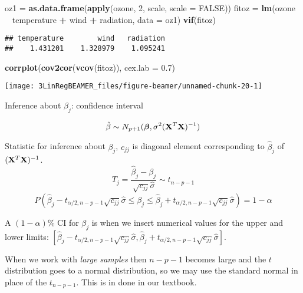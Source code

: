 \documentclass[ignorenonframetext,]{beamer}
\newenvironment{Shaded}{\begin{snugshade}}{\end{snugshade}}
\newcommand{\KeywordTok}[1]{\textcolor[rgb]{0.13,0.29,0.53}{\textbf{#1}}}
\newcommand{\DataTypeTok}[1]{\textcolor[rgb]{0.13,0.29,0.53}{#1}}
\newcommand{\DecValTok}[1]{\textcolor[rgb]{0.00,0.00,0.81}{#1}}
\newcommand{\FloatTok}[1]{\textcolor[rgb]{0.00,0.00,0.81}{#1}}
\newcommand{\StringTok}[1]{\textcolor[rgb]{0.31,0.60,0.02}{#1}}
\newcommand{\OtherTok}[1]{\textcolor[rgb]{0.56,0.35,0.01}{#1}}
\newcommand{\OperatorTok}[1]{\textcolor[rgb]{0.81,0.36,0.00}{\textbf{#1}}}
\newcommand{\NormalTok}[1]{#1}
\begin{document}
\begin{frame}[fragile]

\small

\begin{Shaded}
\begin{Highlighting}[]
\NormalTok{oz1 =}\StringTok{ }\KeywordTok{as.data.frame}\NormalTok{(}\KeywordTok{apply}\NormalTok{(ozone, }\DecValTok{2}\NormalTok{, scale, }\DataTypeTok{scale =} \OtherTok{FALSE}\NormalTok{))}
\NormalTok{fitoz =}\StringTok{ }\KeywordTok{lm}\NormalTok{(ozone }\OperatorTok{~}\StringTok{ }\NormalTok{temperature }\OperatorTok{+}\StringTok{ }\NormalTok{wind }\OperatorTok{+}\StringTok{ }\NormalTok{radiation, }\DataTypeTok{data =}\NormalTok{ oz1)}
\KeywordTok{vif}\NormalTok{(fitoz)}
\end{Highlighting}
\end{Shaded}

\begin{verbatim}
## temperature        wind   radiation 
##    1.431201    1.328979    1.095241
\end{verbatim}

\begin{Shaded}
\begin{Highlighting}[]
\KeywordTok{corrplot}\NormalTok{(}\KeywordTok{cov2cor}\NormalTok{(}\KeywordTok{vcov}\NormalTok{(fitoz)), }\DataTypeTok{cex.lab =} \FloatTok{0.7}\NormalTok{)}
\end{Highlighting}
\end{Shaded}

\texttt{[image: 3LinRegBEAMER\_files/figure-beamer/unnamed-chunk-20-1]}
\normalsize

\end{frame}

\begin{frame}

\begin{block}{Inference about \(\beta_j\): confidence interval}

\[\hat{\beta}\sim N_{p+1}(\boldsymbol{\beta},\sigma^2({\bf X}^T{\bf X})^{-1})\]

Statistic for inference about \(\beta_j\), \(c_{jj}\) is diagonal
element corresponding to \(\hat{\beta}_j\) of
\(({\bf X}^T{\bf X})^{-1}\).
\[ T_j=\frac{\hat{\beta}_j-\beta_j}{\sqrt{c_{jj}}\hat{\sigma}}\sim t_{n-p-1}\]
\[ P(\hat{\beta}_j-t_{\alpha/2,n-p-1}\sqrt{c_{jj}}\hat{\sigma}
\le \beta_j \le \hat{\beta}_j+t_{\alpha/2,n-p-1}\sqrt{c_{jj}}\hat{\sigma})=1-\alpha\]

A \((1-\alpha)\)\% CI for \(\beta_j\) is when we insert numerical values
for the upper and lower limits:
\([\hat{\beta}_j-t_{\alpha/2,n-p-1}\sqrt{c_{jj}}\hat{\sigma},\hat{\beta}_j+t_{\alpha/2,n-p-1}\sqrt{c_{jj}}\hat{\sigma}]\).

When we work with \emph{large samples} then \(n-p-1\) becomes large and
the \(t\) distribution goes to a normal distribution, so we may use the
standard normal in place of the \(t_{n-p-1}\). This is in done in our
textbook.

\end{block}

\end{frame}
\end{document}
